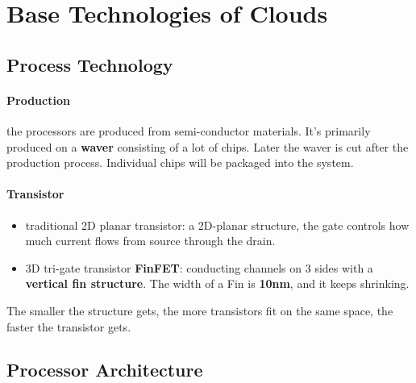 \section{Base Technologies of Clouds}
\subsection{Process Technology}
\paragraph{Production} the processors are produced from semi-conductor materials. It's primarily produced on a \textbf{waver} consisting of a lot of chips. Later the waver is cut after the production process. Individual chips will be packaged into the system.

\paragraph{Transistor} 
\begin{itemize}
	\item traditional 2D planar transistor: a 2D-planar structure, the gate controls how much current flows from source through the drain.
	\item 3D tri-gate transistor \textbf{FinFET}: conducting channels on 3 sides with a \textbf{vertical fin structure}. The width of a Fin is \textbf{10nm}, and it keeps shrinking.
\end{itemize}
The smaller the structure gets, the more transistors fit on the same space, the faster the transistor gets.

\subsection{Processor Architecture}

